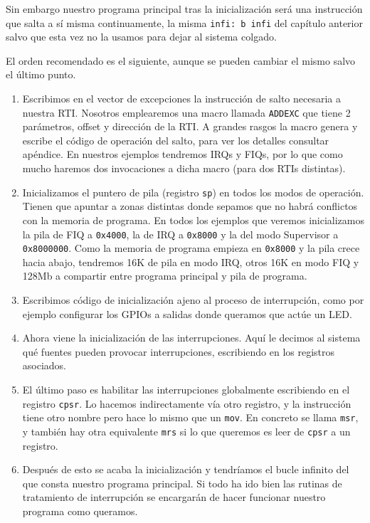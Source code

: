 Sin embargo nuestro programa principal tras la inicialización será una
instrucción que salta a sí misma continuamente, la misma {\tt infi: b infi} del capítulo
anterior salvo que esta vez no la usamos para dejar al sistema colgado.

El orden recomendado es el siguiente, aunque se pueden cambiar el mismo salvo el último punto.

\begin{enumerate}
  \item Escribimos en el vector de excepciones la instrucción de salto necesaria a nuestra RTI.
        Nosotros emplearemos una macro llamada {\tt ADDEXC} que tiene 2 parámetros, offset y
        dirección de la RTI. A grandes rasgos la macro genera y escribe el código de operación
        del salto, para ver los detalles consultar apéndice.
        En nuestros ejemplos tendremos IRQs y FIQs, por lo que como mucho haremos dos
        invocaciones a dicha macro (para dos RTIs distintas).
  \item Inicializamos el puntero de pila (registro {\tt sp}) en todos los modos de operación.
        Tienen que apuntar a zonas distintas donde sepamos que no habrá conflictos con la
        memoria de programa. En todos los ejemplos que veremos inicializamos la pila de FIQ
        a {\tt 0x4000}, la de IRQ a {\tt 0x8000} y la del modo Supervisor a {\tt 0x8000000}.
        Como la memoria de programa empieza en {\tt 0x8000} y la pila crece hacia abajo,
        tendremos 16K de pila en modo IRQ, otros 16K en modo FIQ y 128Mb a compartir entre
        programa principal y pila de programa.
  \item Escribimos código de inicialización ajeno al proceso de interrupción, como por ejemplo
        configurar los GPIOs a salidas donde queramos que actúe un LED.
  \item Ahora viene la inicialización de las interrupciones. Aquí le decimos al sistema qué fuentes
        pueden provocar interrupciones, escribiendo en los registros asociados. 
  \item El último paso es habilitar las interrupciones globalmente escribiendo en el registro
        {\tt cpsr}. Lo hacemos indirectamente vía otro registro, y la instrucción tiene otro
        nombre pero hace lo mismo que un {\tt mov}. En concreto se llama {\tt msr}, y también hay
        otra equivalente {\tt mrs} si lo que queremos es leer de {\tt cpsr} a un registro.
  \item Después de esto se acaba la inicialización y tendríamos el bucle infinito del que consta
        nuestro programa principal. Si todo ha ido bien las rutinas de tratamiento de interrupción
        se encargarán de hacer funcionar nuestro programa como queramos.
\end{enumerate}


